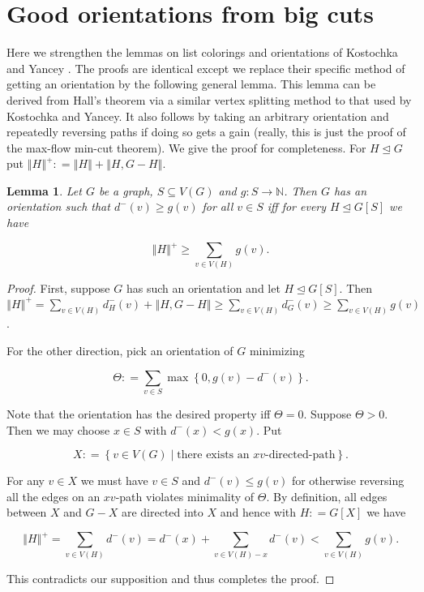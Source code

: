 \documentclass[12pt]{article}
\theoremstyle{plain}
\newtheorem{lem}[thm]{Lemma}
\theoremstyle{definition}
\theoremstyle{remark}
\newcommand{\IN}{\mathbb{N}}
\newcommand{\set}[1]{\left\{ #1 \right\}}
\newcommand{\setb}[3]{\left\{ #1 \in #2 \mid #3 \right\}}
\newcommand{\size}[1]{\left\Vert#1\right\Vert}
\newcommand{\func}[3]{#1\colon #2 \rightarrow #3}
\newcommand{\DefinedAs}{\mathrel{\mathop:}=}
\begin{document}
\section{Good orientations from big cuts}\label{OrientationsSection}
Here we strengthen the lemmas on list colorings and orientations of Kostochka and Yancey \cite{kostochkayancey2012ore}.  The proofs are identical except we replace their specific method of getting an orientation by the following general lemma.  This lemma can be derived from Hall's theorem via a similar vertex splitting method to that used by Kostochka and Yancey. It also follows by taking an arbitrary orientation and repeatedly reversing paths if doing so gets a gain (really, this is just the proof of the max-flow min-cut theorem).  We give the proof for completeness.  For $H \unlhd G$ put $\size{H}^+ \DefinedAs \size{H} + \size{H, G-H}$.

\begin{lem}\label{InOrientations}
Let $G$ be a graph, $S \subseteq V(G)$ and $\func{g}{S}{\IN}$.  Then $G$ has an orientation such that $d^-(v) \geq g(v)$ for all $v \in S$ iff for every $H \unlhd G[S]$ we have

\[\size{H}^+ \geq \sum_{v \in V(H)} g(v).\]
\end{lem}
\begin{proof}
First, suppose $G$ has such an orientation and let $H \unlhd G[S]$.  Then $\size{H}^+ = \sum_{v \in V(H)} d_H^-(v) + \size{H, G-H} \geq \sum_{v \in V(H)} d_G^-(v) \geq \sum_{v \in V(H)} g(v)$.

For the other direction, pick an orientation of $G$ minimizing

\[\Theta \DefinedAs \sum_{v \in S} \max\set{0, g(v) - d^-(v)}.\]

\noindent Note that the orientation has the desired property iff $\Theta = 0$. Suppose $\Theta > 0$.  Then we may choose $x \in S$ with $d^-(x) < g(x)$. Put

\[X \DefinedAs \setb{v}{V(G)}{\text{there exists an $xv$-directed-path}}.\]

\noindent For any $v \in X$ we must have $v \in S$ and $d^-(v) \leq g(v)$ for otherwise reversing all the edges on an $xv$-path violates minimality of $\Theta$.  By definition, all edges between $X$ and $G-X$ are directed into $X$ and hence with $H \DefinedAs G[X]$ we have

\[\size{H}^+ = \sum_{v \in V(H)} d^-(v) = d^-(x) + \sum_{v \in V(H) - x} d^-(v) < \sum_{v \in V(H)} g(v).\]

\noindent This contradicts our supposition and thus completes the proof.
\end{proof}
\end{document}
